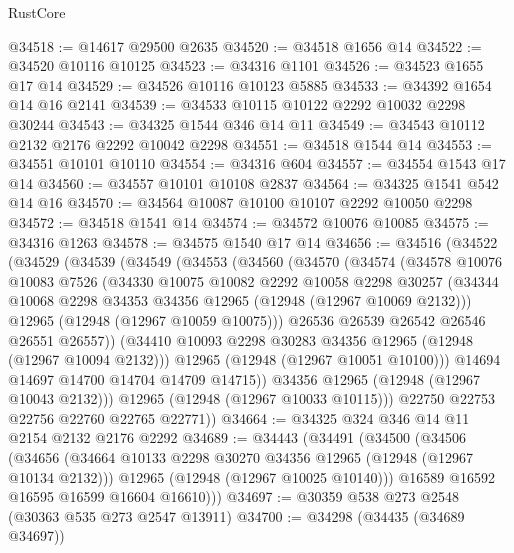 \begin{lexlean}{RustCore}
\begin{coremodule}
@34518 := @14617 @29500 @2635
@34520 := @34518 @1656 @14
@34522 := @34520 @10116 @10125
@34523 := @34316 @1101
@34526 := @34523 @1655 @17 @14
@34529 := @34526 @10116 @10123 @5885
@34533 := @34392 @1654 @14 @16 @2141
@34539 := @34533 @10115 @10122 @2292 @10032 @2298 @30244
@34543 := @34325 @1544 @346 @14 @11
@34549 := @34543 @10112 @2132 @2176 @2292 @10042 @2298
@34551 := @34518 @1544 @14
@34553 := @34551 @10101 @10110
@34554 := @34316 @604
@34557 := @34554 @1543 @17 @14
@34560 := @34557 @10101 @10108 @2837
@34564 := @34325 @1541 @542 @14 @16
@34570 := @34564 @10087 @10100 @10107 @2292 @10050 @2298
@34572 := @34518 @1541 @14
@34574 := @34572 @10076 @10085
@34575 := @34316 @1263
@34578 := @34575 @1540 @17 @14
@34656 := @34516
    (@34522
      (@34529
        (@34539
          (@34549
            (@34553
              (@34560
                (@34570
                  (@34574
                    (@34578
                      @10076
                      @10083
                      @7526
                      (@34330
                        @10075
                        @10082
                        @2292
                        @10058
                        @2298
                        @30257
                        (@34344 @10068 @2298 @34353 @34356 @12965 (@12948 (@12967 @10069 @2132)))
                        @12965
                        (@12948 (@12967 @10059 @10075)))
                      @26536
                      @26539
                      @26542
                      @26546
                      @26551
                      @26557))
                  (@34410 @10093 @2298 @30283 @34356 @12965 (@12948 (@12967 @10094 @2132)))
                  @12965
                  (@12948 (@12967 @10051 @10100)))
                @14694
                @14697
                @14700
                @14704
                @14709
                @14715))
            @34356
            @12965
            (@12948 (@12967 @10043 @2132)))
          @12965
          (@12948 (@12967 @10033 @10115)))
        @22750
        @22753
        @22756
        @22760
        @22765
        @22771))
@34664 := @34325 @324 @346 @14 @11 @2154 @2132 @2176 @2292
@34689 := @34443
    (@34491
      (@34500
        (@34506
          (@34656
            (@34664 @10133 @2298 @30270 @34356 @12965 (@12948 (@12967 @10134 @2132)))
            @12965
            (@12948 (@12967 @10025 @10140)))
          @16589
          @16592
          @16595
          @16599
          @16604
          @16610)))
@34697 := @30359 @538 @273 @2548 (@30363 @535 @273 @2547 @13911)
@34700 := @34298 (@34435 (@34689 @34697))

\end{coremodule}
\end{lexlean}
